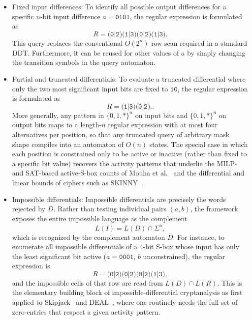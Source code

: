 \begin{itemize}
    \item Fixed input differences: To identify all possible output
          differences for a specific $n$-bit input difference
          $a = \texttt{0101}$, the regular expression is formulated as
          \[
              R = \texttt{(0|2)(1|3)(0|2)(1|3)}.
          \]
          This query replaces the conventional $O(2^n)$ row scan required
          in a standard DDT. Furthermore, it can be reused for other
          values of $a$ by simply changing the transition symbols in the
          query automaton.

    \item Partial and truncated differentials: To evaluate a truncated
          differential where only the two most significant input bits are
          fixed to $\texttt{10}$, the regular expression is formulated as
          \[
              R = \texttt{(1|3)(0|2)..}
          \]
          More generally, any pattern in $\{0,1,*\}^{n}$ on input bits and
          $\{0,1,*\}^{n}$ on output bits maps to a length-$n$ regular
          expression with at most four alternatives per position, so that
          any truncated query of arbitrary mask shape compiles into an
          automaton of $O(n)$ states. The special case in which each
          position is constrained only to be active or inactive (rather
          than fixed to a specific bit value) recovers the activity
          patterns that underlie the MILP- and SAT-based active-S-box
          counts of Mouha et al.~\cite{MouhaEtAl2012} and the differential and linear
          bounds of ciphers such as SKINNY~\cite{BeierleEtAl2016}.

    \item Impossible differentials: Impossible differentials are precisely
          the words rejected by $D$. Rather than testing individual pairs
          $(a,b)$, the framework exposes the entire impossible language
          as the complement
          \[
              L(I) = \overline{L(D)} \cap \Sigma^{n},
          \]
          which is recognized by the complement automaton $\overline{D}$.
          For instance, to enumerate all impossible differentials of a
          $4$-bit S-box whose input has only the least significant bit
          active ($a = \texttt{0001}$, $b$ unconstrained), the regular
          expression is
          \[
              R = \texttt{(0|2)(0|2)(0|2)(1|3)},
          \]
          and the impossible cells of that row are read from
          $\overline{L(D)} \cap L(R)$. This is the elementary
          building block of impossible-differential cryptanalysis as
          first applied to Skipjack~\cite{BihamEtAl1999} and DEAL~\cite{Knudsen1998}, where one
          routinely needs the full set of zero-entries that respect a
          given activity pattern.


\end{itemize}

